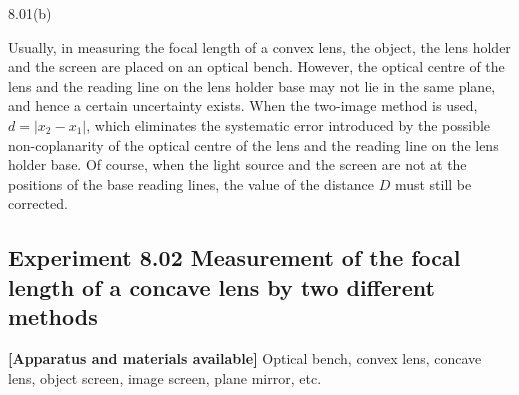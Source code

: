 \begin{figbox}{8.01(b)}
\end{figbox}

Usually, in measuring the focal length of a convex lens, the object, the lens holder and the screen are placed on an optical bench. However, the optical centre of the lens and the reading line on the lens holder base may not lie in the same plane, and hence a certain uncertainty exists. When the two-image method is used, $d=|x_2-x_1|$, which eliminates the systematic error introduced by the possible non-coplanarity of the optical centre of the lens and the reading line on the lens holder base. Of course, when the light source and the screen are not at the positions of the base reading lines, the value of the distance $D$ must still be corrected.

\subsection*{Experiment 8.02 \quad Measurement of the focal length of a concave lens by two different methods}

\textbf{[Apparatus and materials available]} Optical bench, convex lens, concave lens, object screen, image screen, plane mirror, etc.

